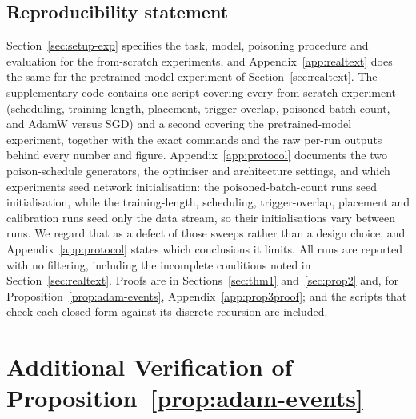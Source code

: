 \documentclass{article} %
\begin{document}
\subsection*{Reproducibility statement}
Section~\ref{sec:setup-exp} specifies the task, model, poisoning procedure and
evaluation for the from-scratch experiments, and Appendix~\ref{app:realtext} does the
same for the pretrained-model experiment of Section~\ref{sec:realtext}. The
supplementary code contains one script covering every from-scratch experiment
(scheduling, training length, placement, trigger overlap, poisoned-batch count, and
AdamW versus SGD) and a second covering the pretrained-model experiment, together with
the exact commands and the raw per-run outputs behind every number and figure.
Appendix~\ref{app:protocol} documents the two poison-schedule generators, the optimiser
and architecture settings, and which experiments seed network initialisation: the
poisoned-batch-count runs seed initialisation, while the training-length, scheduling,
trigger-overlap, placement and calibration runs seed only the data stream, so their
initialisations vary between runs. We regard that as a defect of those sweeps rather
than a design choice, and Appendix~\ref{app:protocol} states which conclusions it
limits. All runs are reported with no filtering, including the incomplete conditions
noted in Section~\ref{sec:realtext}. Proofs are in Sections~\ref{sec:thm1} and~\ref{sec:prop2} and, for Proposition~\ref{prop:adam-events}, Appendix~\ref{app:prop3proof}; and the scripts that check each closed form
against its discrete recursion are included.




\appendix
\section{Additional Verification of Proposition~\ref{prop:adam-events}}
\label{app:adam}
\end{document}

